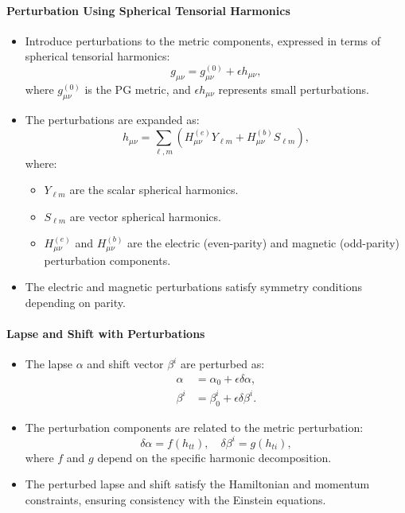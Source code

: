 \documentclass[12pt]{article}
\begin{document}
\paragraph{Perturbation Using Spherical Tensorial Harmonics}
\begin{itemize}
    \item Introduce perturbations to the metric components, expressed in terms of spherical tensorial harmonics:
    \[
    g_{\mu\nu} = g_{\mu\nu}^{(0)} + \epsilon h_{\mu\nu},
    \]
    where $g_{\mu\nu}^{(0)}$ is the PG metric, and $\epsilon h_{\mu\nu}$ represents small perturbations.
    \item The perturbations are expanded as:
    \[
    h_{\mu\nu} = \sum_{\ell,m} \left( H_{\mu\nu}^{(e)} Y_{\ell m} + H_{\mu\nu}^{(b)} S_{\ell m} \right),
    \]
    where:
    \begin{itemize}
        \item $Y_{\ell m}$ are the scalar spherical harmonics.
        \item $S_{\ell m}$ are vector spherical harmonics.
        \item $H_{\mu\nu}^{(e)}$ and $H_{\mu\nu}^{(b)}$ are the electric (even-parity) and magnetic (odd-parity) perturbation components.
    \end{itemize}
    \item The electric and magnetic perturbations satisfy symmetry conditions depending on parity.
\end{itemize}

\paragraph{Lapse and Shift with Perturbations}
\begin{itemize}
    \item The lapse $\alpha$ and shift vector $\beta^i$ are perturbed as:
    \begin{align*}
        \alpha &= \alpha_0 + \epsilon \delta\alpha, \\
        \beta^i &= \beta_0^i + \epsilon \delta\beta^i.
    \end{align*}
    \item The perturbation components are related to the metric perturbation:
    \[
    \delta\alpha = f(h_{tt}), \quad \delta\beta^i = g(h_{ti}),
    \]
    where $f$ and $g$ depend on the specific harmonic decomposition.
    \item The perturbed lapse and shift satisfy the Hamiltonian and momentum constraints, ensuring consistency with the Einstein equations.
\end{itemize}
\end{document}

